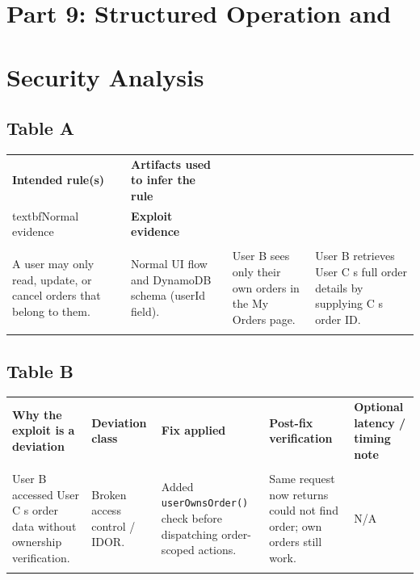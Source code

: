 \documentclass[12pt]{report}
\begin{document}
\section[Part 9: Structured Operation and Security Analysis]{Part 9: Structured Operation and\\\\Security Analysis}
\subsection*{Table A}
\begin{table}[H]
  \small\centering
  \begin{tabularx}{\textwidth}{|Y|Y|Y|Y|}
    \hline
    \textbf{Intended rule(s)} & \textbf{Artifacts used to infer the rule} & \\textbf{Normal evidence} & \textbf{Exploit evidence} \\\\
    \hline
    A user may only read, update, or cancel orders that belong to them. &
    Normal UI flow and DynamoDB schema (userId field). &
    User B sees only their own orders in the My Orders page. &
    User B retrieves User C s full order details by supplying C s order ID. \\\\
    \hline
  \end{tabularx}
\end{table}
 
\subsection*{Table B}
\begin{table}[H]
  \footnotesize\centering
  \begin{tabularx}{\textwidth}{|Y|Y|Y|Y|Y|}
    \hline
    \textbf{Why the exploit is a deviation} & \textbf{Deviation class} & \textbf{Fix applied} & \textbf{Post-fix verification} & \textbf{Optional latency / timing note} \\\\
    \hline
    User B accessed User C s order data without ownership verification. &
    Broken access control / IDOR. &
    Added \texttt{userOwnsOrder()} check before dispatching order-scoped actions. &
    Same request now returns could not find order; own orders still work. &
    N/A \\\\
    \hline
  \end{tabularx}
\end{table}
 
\end{document}
